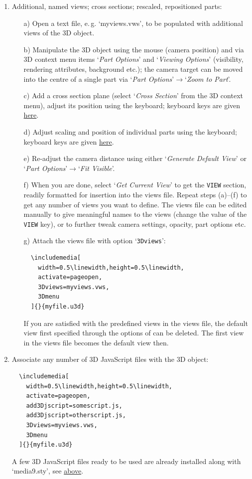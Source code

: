 \documentclass[a4paper]{article}
\begin{document}
\begin{enumerate}
  \setcounter{enumi}{\lastcount}
  \item Additional, named views; cross sections; rescaled, repositioned parts:
  \begin{itemize}
    \item[a)] Open a text file, e.\,g. `myviews.vws', to be populated with additional views of the 3D object.
    \item[b)] Manipulate the 3D object using the mouse (camera position) and via 3D context menu items `\emph{\sffamily Part Options}' and `\emph{\sffamily Viewing Options}' (visibility, rendering attributes, background etc.); the camera target can be moved into the centre of a single part via `\emph{\sffamily Part Options}'$\rightarrow$`\emph{\sffamily Zoom to Part}'.
    \item[c)] Add a cross section plane (select `\emph{\sffamily Cross Section}' from the 3D context menu), adjust its position using the keyboard; keyboard keys are given \hyperlink{3dmenu}{here}.
    \item[d)] Adjust scaling and position of individual parts using the keyboard; keyboard keys are given \hyperlink{3dmenu}{here}.
    \item[e)] Re-adjust the camera distance using either `\emph{\sffamily Generate Default View}' or `\emph{\sffamily Part Options}'$\rightarrow$`\emph{\sffamily Fit Visible}'.
    \item[f)] When you are done, select `\emph{\sffamily Get Current View}' to get the {\tt VIEW} section, readily formatted for insertion into the views file. Repeat steps (a)--(f) to get any number of views you want to define. The views file can be edited manually to give meaningful names to the views (change the value of the {\tt VIEW} key), or to further tweak camera settings, opacity, part options etc.
    \item[g)] Attach the views file with option `{\tt 3Dviews}':
\begin{Verbatim}
  \includemedia[
    width=0.5\linewidth,height=0.5\linewidth,
    activate=pageopen,
    3Dviews=myviews.vws,
    3Dmenu
  ]{}{myfile.u3d}
\end{Verbatim}
  If you are satisfied with the predefined views in the views file, the default view first specified through the options of {\tt\string{}} can be deleted. The first view in the views file becomes the default view then.
  \end{itemize}
  \item Associate any number of 3D JavaScript files with the 3D object:
\begin{Verbatim}
  \includemedia[
    width=0.5\linewidth,height=0.5\linewidth,
    activate=pageopen,
    add3Djscript=somescript.js,
    add3Djscript=otherscript.js,
    3Dviews=myviews.vws,
    3Dmenu
  ]{}{myfile.u3d}
\end{Verbatim}
A few 3D JavaScript files ready to be used are already installed along with `media9.sty', see \hyperlink{3dscripts}{above}.
\end{enumerate}
\end{document}
